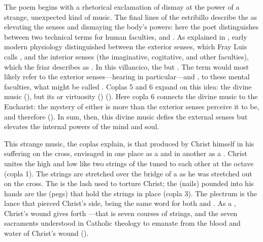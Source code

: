 The poem begins with a rhetorical exclamation of dismay at the power of a
strange, unexpected kind of music.
The final lines of the estribillo describe the  as
elevating the senses and dismaying the body's powers: here the poet
distinguishes between two technical terms for human faculties,
 and .
As explained in , early modern physiology distinguished
between the exterior senses, which Fray Luis calls , and the interior senses (the imaginative, cogitative, and other
faculties), which the friar describes as .
In this villancico, the   but
.  
The term  would most likely refer to the exterior
senses---hearing in particular---and , to these mental
faculties, what might be called .
Coplas 5 and 6 expand on this idea: the divine music  (), but its  or virtuosity
() 
().
Here copla 6 connects the divine music to the Eucharist: the mystery of either
is more than the exterior senses perceive it to be, and therefore
().
In sum, then, this divine music defies the external senses but elevates the
internal powers of the mind and soul.

    
This strange music, the coplas explain, is that produced by Christ himself in
his suffering on the cross, envisaged in one place as a  and in
another as a .
Christ unites the high and low like two strings of the  tuned to
each other at the octave (copla 1).  
The strings are stretched over the bridge of a  as he was
stretched out on the cross.
The  is the lash used to torture Christ; the 
(nails) pounded into his hands are the  (pegs) that hold the
strings in place (copla 3).
The plectrum is the lance that pierced Christ's side,  being the
same word for both  and .
As a , Christ's wound gives forth ---that is
seven courses of strings, and the seven sacraments understood in Catholic
theology to emanate from the blood and water of Christ's wound ().

